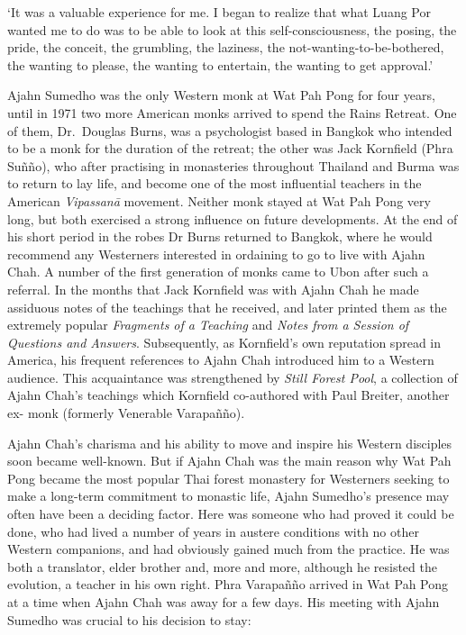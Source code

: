 `It was a valuable experience for me. I
began to realize that what Luang Por wanted me to do was to be able to
look at this self-consciousness, the posing, the pride, the conceit, the
grumbling, the laziness, the not-wanting-to-be-bothered, the wanting to
please, the wanting to entertain, the wanting to get approval.'

Ajahn Sumedho was the only Western monk at Wat Pah Pong for four years, 
until in 1971 two more American monks arrived to spend the Rains
Retreat. One of them, Dr.~Douglas Burns, was a psychologist based in
Bangkok who intended to be a monk for the duration of the retreat; the
other was Jack Kornfield (Phra Suñño), who after practising in
monasteries throughout Thailand and Burma was to return to lay life, and
become one of the most influential teachers in the American
\emph{Vipassanā} movement. Neither monk stayed at Wat Pah Pong very
long, but both exercised a strong influence on future developments. At
the end of his short period in the robes Dr Burns returned to Bangkok, 
where he would recommend any Westerners interested in ordaining to go to
live with Ajahn Chah. A number of the first generation of monks came to
Ubon after such a referral. In the months that Jack Kornfield was with
Ajahn Chah he made assiduous notes of the teachings that he received, 
and later printed them as the extremely popular \emph{Fragments of a
Teaching} and \emph{Notes from a Session of Questions and Answers}. 
Subsequently, as Kornfield's own reputation spread in America, his
frequent references to Ajahn Chah introduced him to a Western audience. 
This acquaintance was strengthened by \emph{Still Forest Pool}, a
collection of Ajahn Chah's teachings which Kornfield co-authored with
Paul Breiter, another ex- monk (formerly Venerable Varapañño). 

Ajahn Chah's charisma and his ability to move and inspire his Western
disciples soon became well-known. But if Ajahn Chah was the main reason
why Wat Pah Pong became the most popular Thai forest monastery for
Westerners seeking to make a long-term commitment to monastic life, 
Ajahn Sumedho's presence may often have been a deciding factor. Here was
someone who had proved it could be done, who had lived a number of years
in austere conditions with no other Western companions, and had
obviously gained much from the practice. He was both a translator, elder
brother and, more and more, although he resisted the evolution, a
teacher in his own right. Phra Varapañño arrived in Wat Pah Pong at a
time when Ajahn Chah was away for a few days. His meeting with Ajahn
Sumedho was crucial to his decision to stay: 

